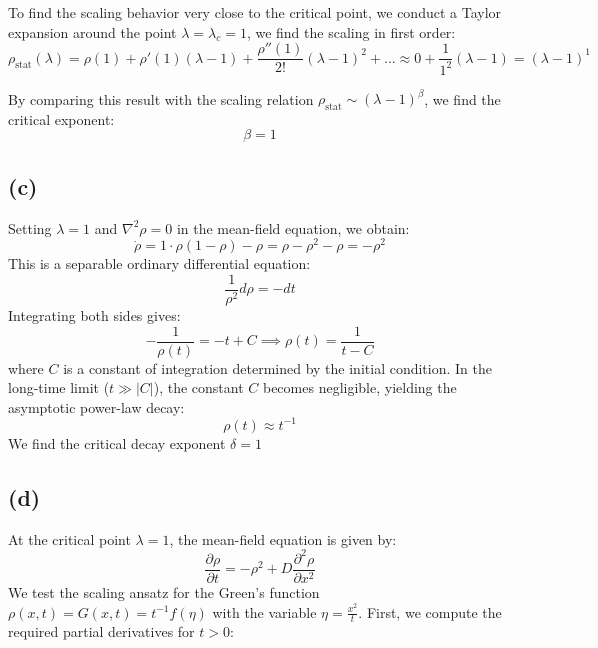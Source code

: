 \documentclass{article}
\begin{document}
To find the scaling behavior very close to the critical point, we conduct a Taylor expansion around the point $\lambda=\lambda_c=1$, we find the scaling in first order:
\begin{equation}
    \rho_{\text{stat}}(\lambda) = \rho(1)+\rho'(1)(\lambda-1) +\frac{\rho''(1)}{2!}(\lambda-1)^2+...\approx 0+ \frac{1}{1^2}(\lambda-1) = \left( \lambda - 1 \right)^1
\end{equation}

By comparing this result with the scaling relation $\rho_{\text{stat}} \sim (\lambda - 1)^\beta$, we find the critical exponent:
\begin{equation}
    \beta = 1
\end{equation}
\subsection*{(c)}
Setting $\lambda = 1$ and $\nabla^2\rho = 0$ in the mean-field equation, we obtain:
\begin{equation}
    \dot{\rho} = 1 \cdot \rho(1 - \rho) - \rho = \rho - \rho^2 - \rho = -\rho^2
\end{equation}
This is a separable ordinary differential equation:
\begin{equation}
    \frac{1}{\rho^2} d\rho = -dt
\end{equation}
Integrating both sides gives:
\begin{equation}
    -\frac{1}{\rho(t)} = -t + C \implies \rho(t) = \frac{1}{t - C}
\end{equation}
where $C$ is a constant of integration determined by the initial condition. In the long-time limit ($t \gg |C|$), the constant $C$ becomes negligible, yielding the asymptotic power-law decay:
\begin{equation}
    \rho(t) \approx t^{-1}
\end{equation}
We find the critical decay exponent $\delta = 1$

\subsection*{(d)}
At the critical point $\lambda = 1$, the mean-field equation is given by:
\begin{equation}
    \frac{\partial \rho}{\partial t} = -\rho^2 + D \frac{\partial^2 \rho}{\partial x^2}
\end{equation}
We test the scaling ansatz for the Green's function $\rho(x,t) = G(x,t) = t^{-1} f(\eta)$ with the variable $\eta = \frac{x^2}{t}$. First, we compute the required partial derivatives for $t > 0$:
\end{document}

